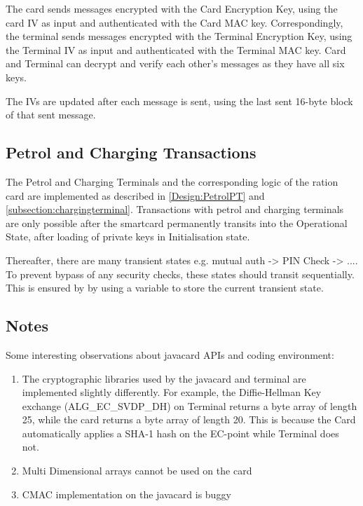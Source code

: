 \documentclass[a4paper,10pt]{llncs}
\begin{document}
The card sends messages encrypted with the Card Encryption Key, using the card IV as input and authenticated with the Card MAC key. Correspondingly, the terminal sends messages encrypted with the Terminal Encryption Key, using the Terminal IV as input and authenticated with the Terminal MAC key. Card and Terminal can decrypt and verify each other's messages as they have all six keys.

The IVs are updated after each message is sent, using the last sent 16-byte block of that sent message.

\subsection{Petrol and Charging Transactions}
The Petrol and Charging Terminals and the corresponding logic of the ration card are implemented as described in \ref{Design:PetrolPT} and \ref{subsection:chargingterminal}. Transactions with petrol and charging terminals are only possible after the smartcard permanently transits into the Operational State, after loading of private keys in Initialisation state.

Thereafter, there are many transient states e.g. mutual auth -> PIN Check -> .... To prevent bypass of any security checks, these states should transit sequentially. This is ensured by by using a variable to store the current transient state.


\subsection{Notes}
Some interesting observations about javacard APIs and coding environment:

\begin{enumerate}
 \item The cryptographic libraries used by the javacard and terminal are implemented slightly differently. For example, the Diffie-Hellman Key exchange (ALG\_EC\_SVDP\_DH) on Terminal returns a byte array of length 25, while the card returns a byte array of length 20. This is because the Card automatically applies a SHA-1 hash on the EC-point while Terminal does not.
 \item Multi Dimensional arrays cannot be used on the card
 \item CMAC implementation on the javacard is buggy
\end{enumerate}
 
\end{document}
